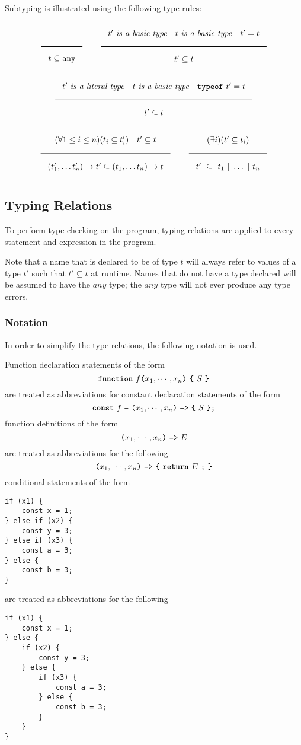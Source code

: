 Subtyping is illustrated using the following type rules:

\noindent
\[
\Rule{}{t \subseteq \Any}
\qquad
\Rule{t'\ \textit{is a basic type} \quad t\ \textit{is a basic type} \quad t' = t}{t' \subseteq t}
\]
\noindent
\[
\Rule{t'\ \textit{is a literal type} \quad t\ \textit{is a basic type} \quad \texttt{typeof}\ t' = t}{t' \subseteq t}
\]
\noindent
\[
\Rule{(\forall 1 \leq i \leq n)(t_i \subseteq t'_i) \quad t' \subseteq t}{(t'_1, \ldots t'_n) \rightarrow t' \subseteq (t_1, \ldots t_n) \rightarrow t}
\qquad
\Rule{(\exists i)(t' \subseteq t_i)}{t'\ \subseteq\ t_1\ |\ \ldots\ |\ t_n}
\]
\noindent

\subsection{Typing Relations}

To perform type checking on the program, typing relations are applied to every statement and expression in the program.

Note that a name that is declared to be of type $t$ will always refer to values of a type $t'$ such that $t' \subseteq t$ at runtime.
Names that do not have a type declared will be assumed to have the $any$ type; the $any$ type will not ever produce any type errors.

\subsubsection{Notation}

In order to simplify the type relations, the following notation is used.

Function declaration statements of the form
%
\[ \Fun\ f \Lp x_1,\cdots, x_n\Rp\ \Lc\ S\ \Rc \]
%
\noindent
are treated as abbreviations for constant declaration statements of the form
%
\[ \Const\ f\ \texttt{=}\ \Lp x_1,\cdots, x_n\Rp\ \texttt{=>}\ \Lc\ S\ \Rc \texttt{;} \]
%
function definitions of the form 
%
\[ \Lp x_1,\cdots, x_n\Rp\ \texttt{=>}\ E \]
%
\noindent
are treated as abbreviations for the following
%
\[ \Lp x_1,\cdots, x_n\Rp\ \texttt{=>}\ \Lc\ \Return\ E\ \texttt{;}\ \Rc \]
%
conditional statements of the form 
\begin{lstlisting}
if (x1) {
    const x = 1;    
} else if (x2) {
    const y = 3;
} else if (x3) {
    const a = 3;
} else {
    const b = 3;
}
\end{lstlisting}
\noindent
are treated as abbreviations for the following
\begin{lstlisting}
if (x1) {
    const x = 1;    
} else {
    if (x2) {
        const y = 3;
    } else {
        if (x3) {
            const a = 3;
        } else {
            const b = 3;
        }
    }
}
\end{lstlisting}

